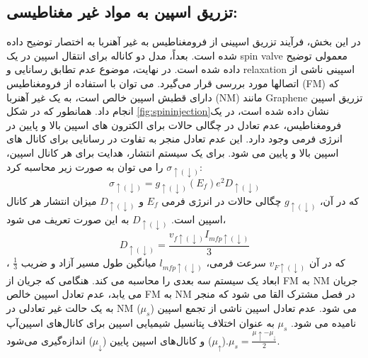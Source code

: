 \subsection{تزریق اسپین به مواد غیر مغناطیسی:}
در این بخش، فرآیند تزریق اسپینی از فرومغناطیس به غیر آهنربا به اختصار توضیح داده شده است. بعداً، مدل دو کاناله برای انتقال اسپین در یک \gls{spin valve} معمولی توضیح داده شده است. در نهایت، موضوع عدم تطابق رسانایی و \gls{relaxation} اسپینی ناشی از اتصالها مورد بررسی قرار می‌گیرد.
می توان با استفاده از فرومغناطیس (\gls{FM}) که دارای قطبش اسپین خالص است، به یک غیر آهنربا (\gls{NM}) مانند \gls{Graphene} تزریق اسپین انجام داد. همانطور که در شکل \ref{fig:spininjection}نشان داده شده است، در یک فرومغناطیس، عدم تعادل در چگالی حالات برای الکترون های اسپین بالا و پایین در انرژی فرمی وجود دارد. این عدم تعادل منجر به تفاوت در رسانایی برای کانال های اسپین بالا و پایین می شود. برای یک سیستم انتشار، هدایت برای هر کانال اسپین، $\sigma_{\uparrow(\downarrow)}$ را می توان به صورت زیر محاسبه کرد:
\begin{equation}
    \sigma_{\uparrow(\downarrow)} = g _{\uparrow(\downarrow)}(E_f) e^2 D_{\uparrow(\downarrow)}
    \label{eq:spintransport}
\end{equation}
که در آن، $g_{\uparrow(\downarrow)}$ چگالی حالات در انرژی فرمی $E_f$ و $D_{\uparrow(\downarrow)}$ میزان انتشار هر کانال اسپین است. $D_{\uparrow(\downarrow)}$ به این صورت تعریف می شود،
\begin{equation}
    D_{\uparrow(\downarrow)}=\frac{v_{f\uparrow(\downarrow)}I_{mfp\uparrow(\downarrow)}}{3}
\end{equation}
، که در آن $v_{F\uparrow(\downarrow)}$ سرعت فرمی، $l_{mfp\uparrow(\downarrow)}$ میانگین طول مسیر آزاد و ضریب $\frac{1}{3}$ ابعاد یک سیستم سه بعدی را محاسبه می کند.
هنگامی که جریان از \gls{FM} به \gls{NM} جریان می یابد، عدم تعادل اسپین خالص \gls{FM} به \gls{NM} در فصل مشترک القا می شود که منجر به یک حالت غیر تعادلی در \gls{NM} می شود. عدم تعادل اسپین ناشی از تجمع اسپین ($\mu_s$) نامیده می شود. $\mu_s$ به عنوان اختلاف پتانسیل شیمیایی اسپین برای کانال‌های اسپین‌آپ ($\mu_{\uparrow}$) و کانال‌های اسپین پایین ($\mu_{\downarrow}$) اندازه‌گیری می‌شود.$\mu_s=\frac{\mu{\uparrow}-\mu_{\downarrow}}{2}$.

